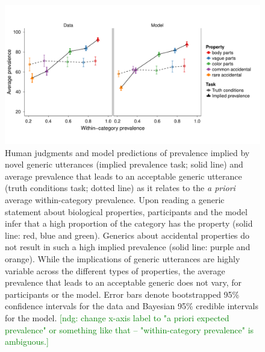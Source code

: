 \documentclass[10pt,letterpaper]{article}
\newcommand{\ndg}[1]{\textcolor{Green}{[ndg: #1]}}
\begin{document}
\begin{figure}
\centering
    \includegraphics[width=1\columnwidth]{asym-lines-data-model-2phi-2so-50kx3.pdf}
    \caption{Human judgments and model predictions of prevalence implied by novel generic utterances (implied prevalence task; solid line) and average prevalence that leads to an acceptable generic utterance (truth conditions task; dotted line) as it relates to the \emph{a priori} average within-category prevalence.
    Upon reading a generic statement about biological properties, participants and the model infer that a high proportion of the category has the property (solid line: red, blue and green). 
    Generics about accidental properties do not result in such a high implied prevalence (solid line: purple and orange).  
	While the implications of generic utterances are highly variable across the different types of properties, the average prevalence that leads to an acceptable generic does not vary, for  participants or the model.
    Error bars denote bootstrapped 95\% confidence intervals for the data and Bayesian 95\% credible intervals for the model.
    \ndg{change x-axis label to "a priori expected prevalence" or something like that -- "within-category prevalence" is ambiguous.}
    }
  \label{fig:exp2b}
\end{figure}
\end{document}
